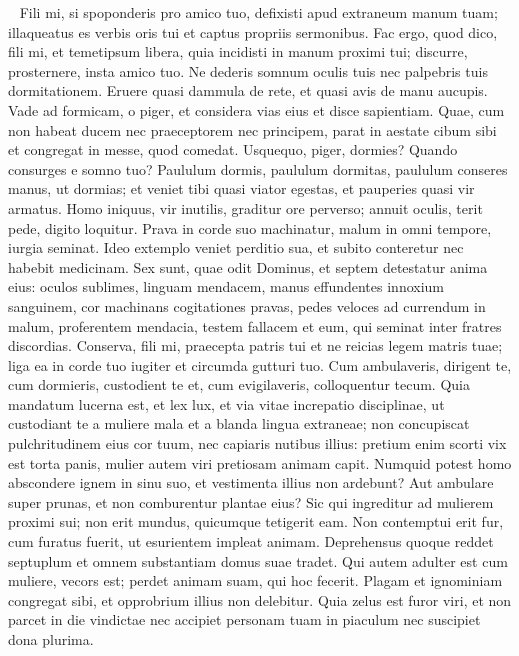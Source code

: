 \begin{biblechapter}   
\verse Fili mi, si spoponderis pro amico tuo, defixisti apud extraneum manum tuam; 
\verse illaqueatus es verbis oris tui et captus propriis sermonibus. 
\verse Fac ergo, quod dico, fili mi, et temetipsum libera, quia incidisti in manum proximi tui; discurre, prosternere, insta amico tuo. 
\verse Ne dederis somnum oculis tuis nec palpebris tuis dormitationem. 
\verse Eruere quasi dammula de rete, et quasi avis de manu aucupis. 
\verse Vade ad formicam, o piger, et considera vias eius et disce sapientiam. 
\verse Quae, cum non habeat ducem nec praeceptorem nec principem, 
\verse parat in aestate cibum sibi et congregat in messe, quod comedat. 
\verse Usquequo, piger, dormies? Quando consurges e somno tuo? 
\verse Paululum dormis, paululum dormitas, paululum conseres manus, ut dormias; 
\verse et veniet tibi quasi viator egestas, et pauperies quasi vir armatus. 
\verse Homo iniquus, vir inutilis, graditur ore perverso; 
\verse annuit oculis, terit pede, digito loquitur. 
\verse Prava in corde suo machinatur, malum in omni tempore, iurgia seminat. 
\verse Ideo extemplo veniet perditio sua, et subito conteretur nec habebit medicinam. 
\verse Sex sunt, quae odit Dominus, et septem detestatur anima eius: 
\verse oculos sublimes, linguam mendacem, manus effundentes innoxium sanguinem, 
\verse cor machinans cogitationes pravas, pedes veloces ad currendum in malum, 
\verse proferentem mendacia, testem fallacem et eum, qui seminat inter fratres discordias. 
\verse Conserva, fili mi, praecepta patris tui et ne reicias legem matris tuae; 
\verse liga ea in corde tuo iugiter et circumda gutturi tuo. 
\verse Cum ambulaveris, dirigent te, cum dormieris, custodient te et, cum evigilaveris, colloquentur tecum. 
\verse Quia mandatum lucerna est, et lex lux, et via vitae increpatio disciplinae, 
\verse ut custodiant te a muliere mala et a blanda lingua extraneae; 
\verse non concupiscat pulchritudinem eius cor tuum, nec capiaris nutibus illius: 
\verse pretium enim scorti vix est torta panis, mulier autem viri pretiosam animam capit. 
\verse Numquid potest homo abscondere ignem in sinu suo, et vestimenta illius non ardebunt? 
\verse Aut ambulare super prunas, et non comburentur plantae eius? 
\verse Sic qui ingreditur ad mulierem proximi sui; non erit mundus, quicumque tetigerit eam. 
\verse Non contemptui erit fur, cum furatus fuerit, ut esurientem impleat animam. 
\verse Deprehensus quoque reddet septuplum et omnem substantiam domus suae tradet. 
\verse Qui autem adulter est cum muliere, vecors est; perdet animam suam, qui hoc fecerit. 
\verse Plagam et ignominiam congregat sibi, et opprobrium illius non delebitur. 
\verse Quia zelus est furor viri, et non parcet in die vindictae 
\verse nec accipiet personam tuam in piaculum nec suscipiet dona plurima. 
\end{biblechapter}

